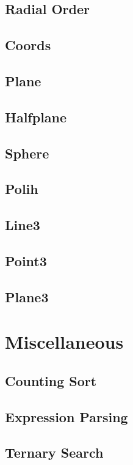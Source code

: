 \subsection{Radial Order}
\raggedbottom
\hrulefill
\subsection{Coords}
\raggedbottom
\hrulefill
\subsection{Plane}
\raggedbottom
\hrulefill
\subsection{Halfplane}
\raggedbottom
\hrulefill
\subsection{Sphere}
\raggedbottom
\hrulefill
\subsection{Polih}
\raggedbottom
\hrulefill
\subsection{Line3}
\raggedbottom
\hrulefill
\subsection{Point3}
\raggedbottom
\hrulefill
\subsection{Plane3}
\raggedbottom
\hrulefill

\section{Miscellaneous}
\subsection{Counting Sort}
\raggedbottom
\hrulefill
\subsection{Expression Parsing}
\raggedbottom
\hrulefill
\subsection{Ternary Search}
\raggedbottom
\hrulefill

